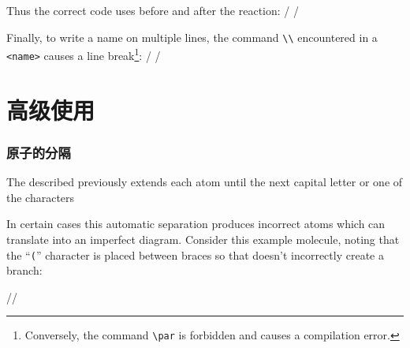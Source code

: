 \documentclass[10pt]{article}
\begin{document}
Thus the correct code uses \idx{\chemnameinit} before and after the reaction:
/
\chemsign{+}
\chemrel{->}
\chemsign{+}
\chemnameinit{}/

Finally, to write a name on multiple lines, the command \verb-\\- encountered in a \verb-<name>- causes a line break\footnote{Conversely, the command \texttt{\textbackslash par} is forbidden and causes a compilation error.}:
/
\chemsign{+}
\chemrel{->}
\chemsign{+}
\chemnameinit{}/
\newpage

\part{高级使用}\label{utilisation.avancee}
\section{原子的分隔}\label{decoupage.atomes}
The  described previously extends each atom until the next capital letter or one of the characters {\ttfamily \boxedfalseverb{-} \boxedfalseverb{=} \boxedfalseverb{~} \boxedfalseverb{(} \boxedfalseverb{!} \boxedfalseverb{*} \boxedfalseverb{<} \boxedfalseverb{>} }

In certain cases this automatic separation produces incorrect atoms which can translate into an imperfect diagram. Consider this example molecule, noting that the ``\texttt('' character is placed between braces so that \CF doesn't incorrectly create a branch:

//
\end{document}
